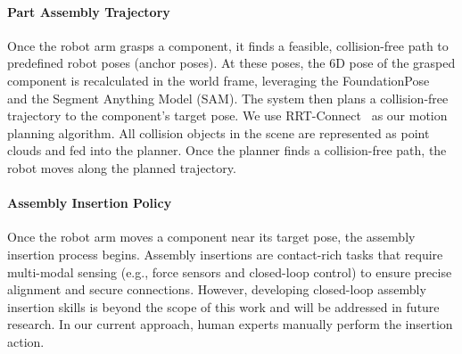 \paragraph{Part Assembly Trajectory}  
\label{sec:method-realworld-assemble}  

Once the robot arm grasps a component, it finds a feasible, collision-free path to predefined robot poses (anchor poses). At these poses, the 6D pose of the grasped component is recalculated in the world frame, leveraging the FoundationPose ~\cite{wen2024foundationpose} and the Segment Anything Model (SAM)\cite{kirillov2023segany}. The system then plans a collision-free trajectory to the component's target pose. We use RRT-Connect~\cite{kuffner2000rrt} as our motion planning algorithm. All collision objects in the scene are represented as point clouds and fed into the planner. Once the planner finds a collision-free path, the robot moves along the planned trajectory.

\paragraph{Assembly Insertion Policy}
Once the robot arm moves a component near its target pose, the assembly insertion process begins. Assembly insertions are contact-rich tasks that require multi-modal sensing (e.g., force sensors and closed-loop control) to ensure precise alignment and secure connections. However, developing closed-loop assembly insertion skills is beyond the scope of this work and will be addressed in future research. In our current approach, human experts manually perform the insertion action.



